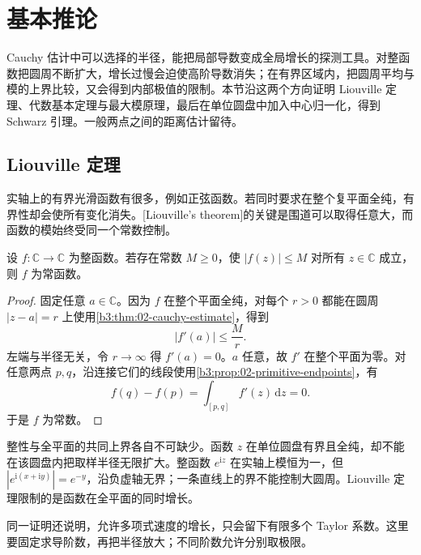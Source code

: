 \section{基本推论}
\label{b3:sec:0204}

Cauchy 估计中可以选择的半径，能把局部导数变成全局增长的探测工具。对整函数把圆周不断扩大，增长过慢会迫使高阶导数消失；在有界区域内，把圆周平均与模的上界比较，又会得到内部极值的限制。本节沿这两个方向证明 Liouville 定理、代数基本定理与最大模原理，最后在单位圆盘中加入中心归一化，得到 Schwarz 引理。一般两点之间的距离估计留待。

\subsection{Liouville 定理}
\label{b3:subsec:020401}

实轴上的有界光滑函数有很多，例如正弦函数。若同时要求在整个复平面全纯，有界性却会使所有变化消失。[Liouville's theorem]的关键是围道可以取得任意大，而函数的模始终受同一个常数控制。

\begin{theorem}[Liouville]\label{b3:thm:02-liouville}
设 \(f:\mathbb C\to\mathbb C\) 为整函数。若存在常数 \(M\ge0\)，使 \(|f(z)|\le M\) 对所有 \(z\in\mathbb C\) 成立，则 \(f\) 为常函数。
\end{theorem}
\begin{proof}
固定任意 \(a\in\mathbb C\)。因为 \(f\) 在整个平面全纯，对每个 \(r>0\) 都能在圆周 \(|z-a|=r\) 上使用\cref{b3:thm:02-cauchy-estimate}，得到
\[
 |f'(a)|\le\frac{M}{r}.
\]
左端与半径无关，令 \(r\to\infty\) 得 \(f'(a)=0\)。\(a\) 任意，故 \(f'\) 在整个平面为零。对任意两点 \(p,q\)，沿连接它们的线段使用\cref{b3:prop:02-primitive-endpoints}，有
\[
 f(q)-f(p)=\int_{[p,q]}f'(z)\,\mathrm{d}z=0.
\]
于是 \(f\) 为常数。
\end{proof}

整性与全平面的共同上界各自不可缺少。函数 \(z\) 在单位圆盘有界且全纯，却不能在该圆盘内把取样半径无限扩大。整函数 \(e^{\mathrm{i}z}\) 在实轴上模恒为一，但 \(|e^{\mathrm{i}(x+\mathrm{i}y)}|=e^{-y}\)，沿负虚轴无界；一条直线上的界不能控制大圆周。Liouville 定理限制的是函数在全平面的同时增长。

\ProseParagraphBreak

同一证明还说明，允许多项式速度的增长，只会留下有限多个 Taylor 系数。这里要固定求导阶数，再把半径放大；不同阶数允许分别取极限。

